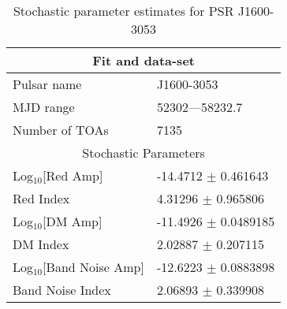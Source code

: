 \documentclass{article}
\begin{document}
\begin{table*}
\caption{Stochastic parameter estimates for PSR J1600-3053}
\begin{tabular}{ll}
\hline\hline
\multicolumn{2}{c}{Fit and data-set} \\ 
\hline
Pulsar name\dotfill & J1600-3053 \\ 
MJD range\dotfill & 52302---58232.7 \\ 
Number of TOAs\dotfill & 7135 \\
\hline
\multicolumn{2}{c}{Stochastic Parameters} \\ 
\hline
Log$_{10}$[Red Amp] \dotfill & -14.4712 $\pm$ 0.461643  \\ 
Red Index \dotfill & 4.31296 $\pm$ 0.965806  \\ 
Log$_{10}$[DM Amp] \dotfill & -11.4926 $\pm$ 0.0489185  \\ 
DM Index \dotfill & 2.02887 $\pm$ 0.207115  \\ 
Log$_{10}$[Band Noise Amp] \dotfill & -12.6223 $\pm$ 0.0883898  \\ 
Band Noise Index \dotfill & 2.06893 $\pm$ 0.339908  \\ 
\hline
\end{tabular}
\label{Table:J1600-3053}
\end{table*} 
\end{document}
